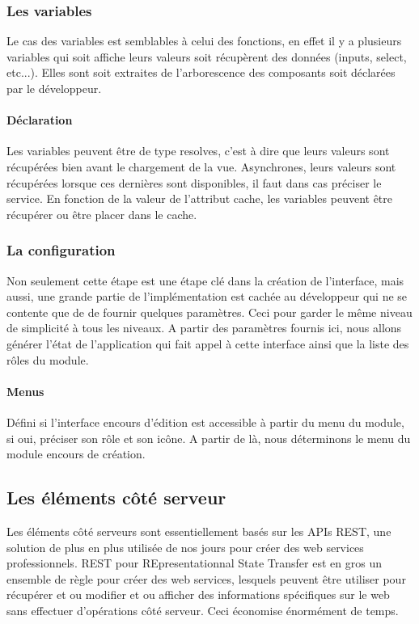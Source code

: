 \documentclass[a4paper,12pt]{article}
\begin{document}
\subsubsection{ Les variables}
Le cas des variables est semblables à celui des fonctions, en effet il y a plusieurs variables
qui soit affiche leurs valeurs soit récupèrent des données (inputs, select, etc...). Elles sont soit extraites 
de l'arborescence des composants soit déclarées par le développeur.
\paragraph{Déclaration}
Les variables  peuvent être de type  resolves, c'est à dire que
leurs valeurs sont récupérées bien avant le chargement de la
vue. Asynchrones, leurs valeurs sont récupérées lorsque ces dernières
sont disponibles, il faut dans cas préciser le service.%
En fonction de la valeur de l'attribut cache, les variables peuvent être récupérer  ou être  placer dans le cache. 

\subsubsection{ La configuration} 
Non seulement cette étape est une étape clé dans la création de l'interface,
mais aussi, une grande partie de l'implémentation
est cachée au développeur qui ne se contente que de de fournir quelques paramètres. 
Ceci pour garder le même niveau de simplicité à tous les niveaux. A partir des paramètres fournis
ici, nous allons générer l'état de l'application qui fait appel à cette interface ainsi que la liste des rôles du module.
\paragraph{Menus}
Défini si l'interface encours d'édition est accessible à partir du menu du module,
si oui, préciser son rôle et son icône. A partir de là, nous déterminons le menu 
du module encours de création. 

\subsection{Les éléments côté serveur}
Les éléments côté serveurs sont  essentiellement  basés sur les APIs REST,
une solution de plus en plus utilisée de nos jours pour créer des web services professionnels.
REST pour REpresentationnal  State Transfer est en gros  un ensemble de règle pour créer des web services,
lesquels peuvent être utiliser pour récupérer et ou modifier et ou afficher  des informations spécifiques sur le web
sans effectuer d'opérations côté serveur. Ceci économise  énormément de temps.
\end{document}
